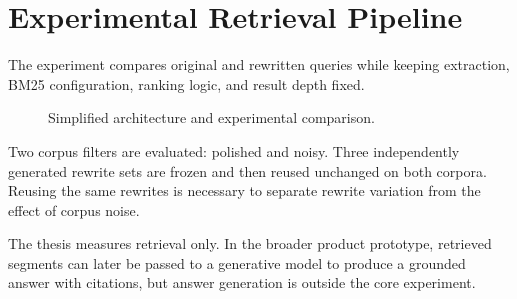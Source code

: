 \section{Experimental Retrieval Pipeline}
The experiment compares original and rewritten queries while keeping extraction, BM25 configuration, ranking logic, and result depth fixed.

\begin{figure}[h]
\centering
{}
\caption{Simplified architecture and experimental comparison.}
\label{fig:pipeline}
\end{figure}

Two corpus filters are evaluated: polished and noisy. Three independently generated rewrite sets are frozen and then reused unchanged on both corpora. Reusing the same rewrites is necessary to separate rewrite variation from the effect of corpus noise.

The thesis measures retrieval only. In the broader product prototype, retrieved segments can later be passed to a generative model to produce a grounded answer with citations, but answer generation is outside the core experiment.
\par
